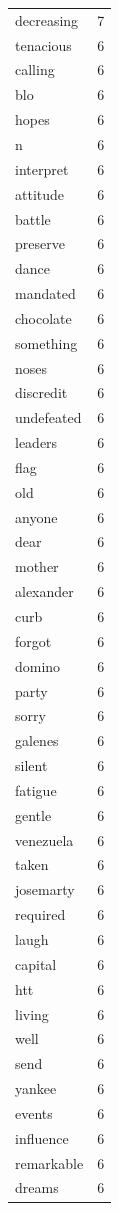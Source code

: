 \begin{tabular}{lr}
decreasing & 7 \\
tenacious & 6 \\
calling & 6 \\
blo & 6 \\
hopes & 6 \\
n & 6 \\
interpret & 6 \\
attitude & 6 \\
battle & 6 \\
preserve & 6 \\
dance & 6 \\
mandated & 6 \\
chocolate & 6 \\
something & 6 \\
noses & 6 \\
discredit & 6 \\
undefeated & 6 \\
leaders & 6 \\
flag & 6 \\
old & 6 \\
anyone & 6 \\
dear & 6 \\
mother & 6 \\
alexander & 6 \\
curb & 6 \\
forgot & 6 \\
domino & 6 \\
party & 6 \\
sorry & 6 \\
galenes & 6 \\
silent & 6 \\
fatigue & 6 \\
gentle & 6 \\
venezuela & 6 \\
taken & 6 \\
josemarty & 6 \\
required & 6 \\
laugh & 6 \\
capital & 6 \\
htt & 6 \\
living & 6 \\
well & 6 \\
send & 6 \\
yankee & 6 \\
events & 6 \\
influence & 6 \\
remarkable & 6 \\
dreams & 6 \\

\end{tabular}
